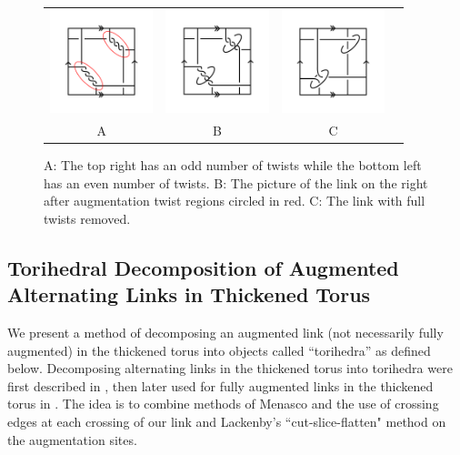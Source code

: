 \documentclass[11pt]{amsart}
\theoremstyle{plain}
\theoremstyle{definition}
\begin{document}
\begin{figure}
\centering
\begin{tabular}{cccc}
\includegraphics[width=3cm]{fig1.png}&
\includegraphics[width=3cm]{twist-augment.png}&
\includegraphics[width=3cm]{fig-2.png}\\
A&B&C
\end{tabular}
	 \caption{A: The top right has an odd number of twists while the bottom left has
	 an even number of twists. B: The picture of the link on the right after
	 augmentation twist regions circled in red. C: The link with full twists
	 removed.}
\label{fig:Augmentations}
\end{figure}

\subsection{Torihedral Decomposition of Augmented Alternating Links in Thickened Torus}


We present a method of decomposing an augmented link
(not necessarily fully augmented) in the thickened torus into
objects called ``torihedra'' as defined below.
Decomposing alternating links in the thickened torus into 
torihedra were first described in \cite{CKP2},
then later used for fully augmented links in 
the thickened torus in \cite{kwon2020fully}.
The idea is to combine methods of Menasco \cite{Menasco}
and the use of crossing edges at each crossing of our link
and Lackenby's ``cut-slice-flatten" method \cite{lackenby}
on the augmentation sites.
\end{document}
